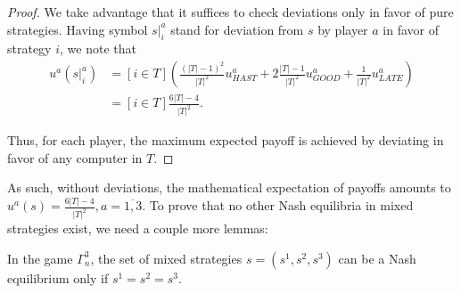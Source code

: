 \begin{proof}
	We take advantage that it suffices to check deviations only in favor of pure strategies. Having symbol $\left. s \right|^a_i$ stand for deviation from $s$ by player $a$ in favor of strategy $i$, we note that %
	\begin{align*}
		u^a(\left. s \right|^a_i) &= [i \in T] \left(\frac{(\left| T \right| - 1)^2}{\left| T \right|^2} u^a_{HAST} + 2 \frac{\left| T \right| - 1}{\left| T \right|^2} u^a_{GOOD} + \frac{1}{\left| T \right|^2} u^a_{LATE}\right)\\
		&= [i \in T] \frac{6 \left| T \right| - 4}{\left| T \right|^2}.
	\end{align*}
	
	Thus, for each player, the maximum expected payoff is achieved by deviating in favor of any computer in $T$. %
\end{proof}

As such, without deviations, the mathematical expectation of payoffs amounts to $u^a(s) = \frac{6 \left| T \right| - 4}{\left| T \right|^2}, a = \overline{1,3}$. To prove that no other Nash equilibria in mixed strategies exist, we need a couple more lemmas: %

\begin{lemma}
	In the game $\Gamma^3_n$, the set of mixed strategies $s = (s^1, s^2, s^3)$ can be a Nash equilibrium only if $s^1 = s^2 = s^3$. %
\end{lemma}

